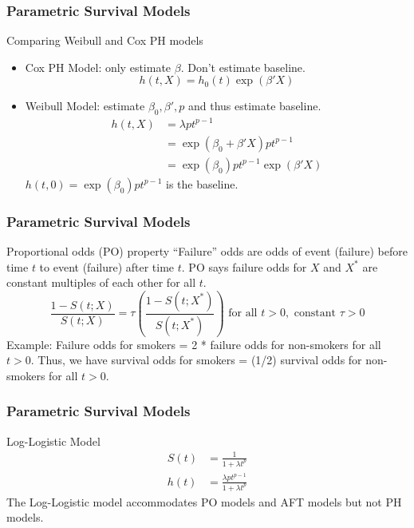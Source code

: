 \documentclass{beamer}
\theoremstyle{definition}
\begin{document}
\begin{frame}
\frametitle{Parametric Survival Models}
\begin{block}{Comparing Weibull and Cox PH models}
\begin{itemize}
\item Cox PH Model: only estimate $\beta$. Don't estimate baseline.
\[
h(t,X) = h_0(t)\exp(\beta'X)
\]
\item Weibull Model: estimate $\beta_0, \beta', p$ and thus estimate baseline.
\begin{align*}
h(t,X) &= \lambda p  t^{p-1} \\
&=\exp(\beta_0 + \beta'X)p t^{p-1} \\
&=\exp(\beta_0)p t^{p-1} \exp(\beta'X)
\end{align*}
$h(t,0) = \exp(\beta_0)p t^{p-1}$ is the baseline.
\end{itemize}
\end{block}
\end{frame}

\begin{frame}
\frametitle{Parametric Survival Models}
\begin{block}{Proportional odds (PO) property}
``Failure'' odds are odds of event (failure) before time $t$ to event (failure) after time $t$. PO says failure odds for $X$ and $X^*$ are constant multiples of each other for all $t$.
\[ \frac{1- S(t;X)}{S(t;X)} = \tau \left(\frac{1- S(t;X^*)}{S(t;X^*)}\right)  \text{ for all } t>0, \text{ constant } \tau > 0
\]
Example: Failure odds for smokers = 2 * failure odds for non-smokers for all $t>0$. Thus, we have survival odds for smokers = (1/2) survival odds for non-smokers for all $t>0$.
\end{block}
\end{frame}

\begin{frame}
\frametitle{Parametric Survival Models}
\begin{block}{Log-Logistic Model}
\vspace{-20pt}
\begin{align*}
S(t)&=\frac{1}{1+\lambda t^p}  \\
h(t)&= \frac{\lambda p t^{p-1}}{1+\lambda t^p}
\end{align*}
The Log-Logistic model accommodates PO models and AFT models but not PH models.
\end{block}
\end{frame}
\end{document}
